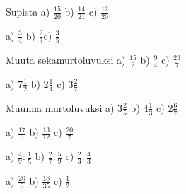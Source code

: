\begin{tehtavasivu}
\begin{tehtava}
Supista \quad
a) $\frac{15}{20}$ \qquad b) $\frac{14}{21}$ \qquad c) $\frac{12}{20}$
\begin{vastaus}
a) $\frac{3}{4}$ \qquad b) $\frac{2}{3}$\qquad c) $\frac{3}{5}$
\end{vastaus}
\end{tehtava}

\begin{tehtava}
Muuta sekamurtoluvuksi \quad
a) $\frac{15}{2}$ \qquad b) $\frac{9}{4}$ \qquad c) $\frac{23}{7}$
\begin{vastaus}
a) $7\frac{1}{2}$ \qquad b) $2\frac{1}{4}$ \qquad c) $3\frac{2}{7}$
\end{vastaus}
\end{tehtava}

\begin{tehtava}
Muunna murtoluvuksi \quad
a) $3\frac{2}{5}$ \qquad b) $4\frac{1}{3}$ \qquad c) $2\frac{6}{7}$
\begin{vastaus}
a) $\frac{17}{5}$ \qquad b) $\frac{13}{12}$ \qquad c) $\frac{20}{7}$
\end{vastaus}
\end{tehtava}

\begin{tehtava}
a) $\frac{4}{9} : \frac{1}{5}$ \qquad b) $\frac{2}{7}:\frac{5}{9}$ \qquad c) $\frac{2}{3}:\frac{4}{3}$
\begin{vastaus}
a) $\frac{20}{9}$ \qquad b) $\frac{18}{35}$ \qquad c) $\frac{1}{2}$
\end{vastaus}
\end{tehtava}

\end{tehtavasivu}